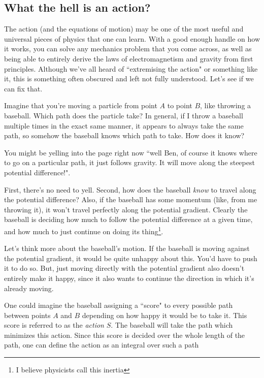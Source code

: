 \documentclass{article}
\begin{document}
\subsection{What the hell is an action?}
The action (and the equations of motion) may be one of the most useful and universal pieces of physics that one can learn. With a good enough handle on how it works, you can solve any mechanics problem that you come across, as well as being able to entirely derive the laws of electromagnetism and gravity from first principles. Although we've all heard of ``extremising the action" or something like it, this is something often obscured and left not fully understood. Let's see if we can fix that.

Imagine that you're moving a particle from point $A$ to point $B$, like throwing a baseball. Which path does the particle take? In general, if I throw a baseball multiple times in the exact same manner, it appears to always take the same path, so somehow the baseball knows which path to take. How does it know?

You might be yelling into the page right now ``well Ben, of course it knows where to go on a particular path, it just follows gravity. It will move along the steepest potential difference!". 

First, there's no need to yell. Second, how does the baseball \textit{know} to travel along the potential difference? Also, if the baseball has some momentum (like, from me throwing it), it won't travel perfectly along the potential gradient. Clearly the baseball is deciding how much to follow the potential difference at a given time, and how much to just continue on doing its thing\footnote{I believe physicists call this inertia}.

Let's think more about the baseball's motion. If the baseball is moving against the potential gradient, it would be quite unhappy about this. You'd have to push it to do so. But, just moving directly with the potential gradient also doesn't entirely make it happy, since it also wants to continue the direction in which it's already moving.

One could imagine the baseball assigning a ``score" to every possible path between points $A$ and $B$ depending on how happy it would be to take it. This score is referred to as the \textit{action} $S$. The baseball will take the path which minimizes this action. Since this score is decided over the whole length of the path, one can define the action as an integral over such a path
\end{document}
